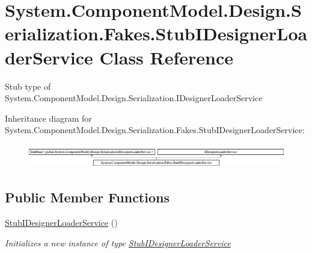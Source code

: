 \hypertarget{class_system_1_1_component_model_1_1_design_1_1_serialization_1_1_fakes_1_1_stub_i_designer_loader_service}{\section{System.\-Component\-Model.\-Design.\-Serialization.\-Fakes.\-Stub\-I\-Designer\-Loader\-Service Class Reference}
\label{class_system_1_1_component_model_1_1_design_1_1_serialization_1_1_fakes_1_1_stub_i_designer_loader_service}
}


Stub type of System.\-Component\-Model.\-Design.\-Serialization.\-I\-Designer\-Loader\-Service 


Inheritance diagram for System.\-Component\-Model.\-Design.\-Serialization.\-Fakes.\-Stub\-I\-Designer\-Loader\-Service\-:\begin{figure}[H]
\begin{center}
\leavevmode
\includegraphics[height=1.046729cm]{class_system_1_1_component_model_1_1_design_1_1_serialization_1_1_fakes_1_1_stub_i_designer_loader_service}
\end{center}
\end{figure}
\subsection*{Public Member Functions}
\begin{DoxyCompactItemize}
\item 
\hyperlink{class_system_1_1_component_model_1_1_design_1_1_serialization_1_1_fakes_1_1_stub_i_designer_loader_service_a6311d1fe9ce9b91cb7a184d766ba9d3e}{Stub\-I\-Designer\-Loader\-Service} ()
\begin{DoxyCompactList}\small\item\em Initializes a new instance of type \hyperlink{class_system_1_1_component_model_1_1_design_1_1_serialization_1_1_fakes_1_1_stub_i_designer_loader_service}{Stub\-I\-Designer\-Loader\-Service}\end{DoxyCompactList}\end{DoxyCompactItemize}
